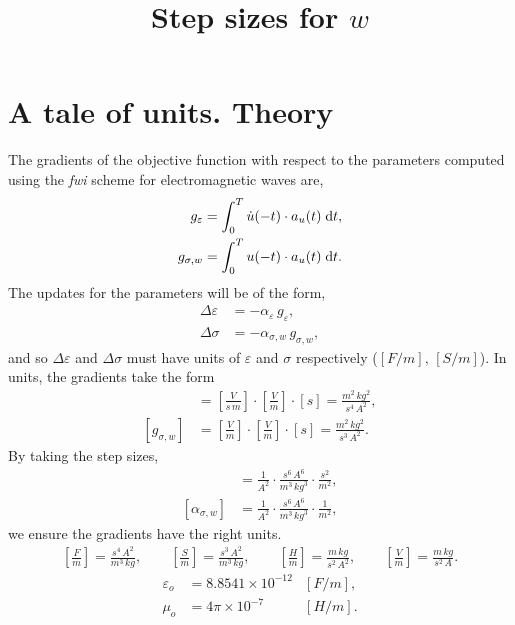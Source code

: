\documentclass[a4paper,12pt]{article}
\title{Step sizes for $w$}
\author{}
\date{}
\begin{document}
\maketitle
\section*{A tale of units. Theory}
The gradients of the objective function with respect to the parameters computed using the {\it fwi} scheme for electromagnetic waves are,
\begin{align*}
g_{\varepsilon} &= \int_0^T \dot{u}(-t)\cdot a_u(t) \; {\rm d}t, \\
g_{\sigma,w} &= \int_0^T u(-t)\cdot a_u(t) \; {\rm d}t.
\end{align*}
The updates for the parameters will be of the form,
\begin{align*}
\Delta\varepsilon &= -\alpha_\varepsilon \, g_{\varepsilon}, \\
\Delta\sigma &= -\alpha_{\sigma,w} \, g_{\sigma,w},
\end{align*}
and so $\Delta\varepsilon$ and $\Delta\sigma$ must have units of $\varepsilon$ and $\sigma$ respectively ($[F/m],\,[S/m]$). In units, the gradients take the form
\begin{align*}
[g_{\varepsilon}] &= \left[\frac{V}{s\,m}\right] \cdot \left[ \frac{V}{m} \right] \cdot [s]=\frac{m^2\,kg^2}{s^4\,A^2}, \\
[g_{\sigma,w}] &= \left[\frac{V}{m}\right] \cdot \left[ \frac{V}{m} \right] \cdot [s] = \frac{m^2\,kg^2}{s^3\,A^2}.
\end{align*}
By taking the step sizes,
\begin{align*}
[\alpha_{\varepsilon}] &= \frac{1}{A^2} \cdot 
\frac{s^6\,A^6}{m^3\,kg^3} \cdot
\frac{s^2}{m^2} , \\
[\alpha_{\sigma,w}] &= \frac{1}{A^2} \cdot 
\frac{s^6\,A^6}{m^3\,kg^3} \cdot
\frac{1}{m^2},
\end{align*}
we ensure the gradients have the right units. 
\begin{align*}
\left[\frac{F}{m}\right] = \frac{s^4\,A^2}{m^3\,kg}, \hspace{2em} 
\left[\frac{S}{m}\right] = \frac{s^3\,A^2}{m^3\,kg}, \hspace{2em} 
\left[\frac{H}{m}\right] = \frac{m\,kg}{s^2\,A^2}, \hspace{2em}
\left[\frac{V}{m}\right] = \frac{m\,kg}{s^2\,A}.
\end{align*}
\begin{align*}
\varepsilon_o &= 8.8541 \times 10^{-12} & [F/m],\\
\mu_o &= 4\pi \times 10^{-7} & [H/m].
\end{align*}
\end{document}
